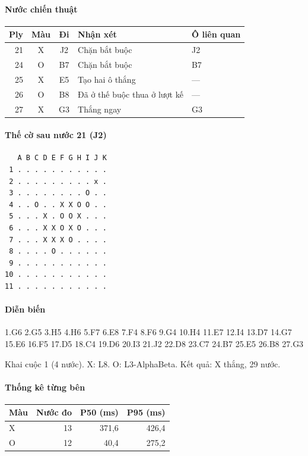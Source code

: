 \paragraph{Nước chiến thuật}
\begin{center}\small
\begin{tabular}{@{}rccll@{}}
\toprule
Ply & Màu & Đi & Nhận xét & Ô liên quan \\
\midrule
21 & X & J2 & Chặn bắt buộc & J2 \\
24 & O & B7 & Chặn bắt buộc & B7 \\
25 & X & E5 & Tạo hai ô thắng & — \\
26 & O & B8 & Đã ở thế buộc thua ở lượt kế & — \\
27 & X & G3 & Thắng ngay & G3 \\
\bottomrule
\end{tabular}
\end{center}
\paragraph{Thế cờ sau nước 21 (J2)}
\begin{verbatim}
   A B C D E F G H I J K
 1 . . . . . . . . . . .
 2 . . . . . . . . . x .
 3 . . . . . . . . O . .
 4 . . O . . X X O O . .
 5 . . . X . O O X . . .
 6 . . . X X O X O . . .
 7 . . . X X X O . . . .
 8 . . . . O . . . . . .
 9 . . . . . . . . . . .
10 . . . . . . . . . . .
11 . . . . . . . . . . .
\end{verbatim}
\paragraph{Diễn biến}
{\footnotesize 1.G6 2.G5 3.H5 4.H6 5.F7 6.E8 7.F4 8.F6 9.G4 10.H4 11.E7 12.I4 13.D7 14.G7 15.E6 16.F5 17.D5 18.C4 19.D6 20.I3 21.J2 22.D8 23.C7 24.B7 25.E5 26.B8 27.G3\par}
Khai cuộc 1 (4 nước). X: L8. O: L3-AlphaBeta. Kết quả: X thắng, 29 nước.
\paragraph{Thống kê từng bên}
\begin{center}\small
\begin{tabular}{@{}lrrr@{}}
\toprule
Màu & Nước đo & P50 (ms) & P95 (ms) \\
\midrule
X & 13 & 371,6 & 426,4 \\
O & 12 & 40,4 & 275,2 \\
\bottomrule
\end{tabular}
\end{center}
